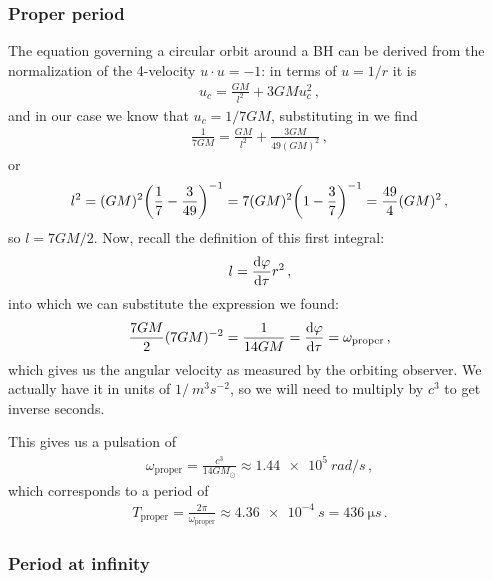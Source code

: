\documentclass[main.tex]{subfiles}
\begin{document}
\subsubsection{Proper period}

The equation governing a circular orbit around a BH can be derived from the normalization of the 4-velocity \(u \cdot u = -1\): in terms of \(u = 1/r\) it is 
%
\begin{align}
  u_c = \frac{GM}{l^2} + 3 GM u_c^2
\,,
\end{align}
%
and in our case we know that \(u_c = 1/7GM\), substituting in we find 
%
\begin{align}
  \frac{1}{7GM} = \frac{GM}{l^2} + \frac{3GM}{49 (GM)^2}
\,,
\end{align}
%
or 
%
\begin{align}
  l^2 = (GM)^2 \qty(\frac{1}{7} - \frac{3}{49})^{-1}
  = 7 (GM)^2 \qty(1 - \frac{3}{7})^{-1} = \frac{49}{4} (GM)^2
\,, 
\end{align}
%
so \(l = 7GM/2\). Now, recall the definition of this first integral: 
%
\begin{align}
  l = \dv{\varphi }{\tau } r^2
\,,
\end{align}
%
into which we can substitute the expression we found: 
%
\begin{align}
  \frac{7GM}{2} (7GM)^{-2} = \frac{1}{14GM} =  \dv{\varphi }{\tau } = \omega_{\text{proper}}
\,,
\end{align}
%
which gives us the angular velocity as measured by the orbiting observer. We actually have it in units of $1/\SI{}{m^3 s^{-2}}$, so we will need to multiply by \(c^3\) to get inverse seconds.

This gives us a pulsation of 
%
\begin{align}
  \omega _{\text{proper}} = \frac{c^3}{14GM_{\odot}} \approx 
  \SI{1.44e5}{rad/s}
\,,
\end{align}
%
which corresponds to a period of 
%
\begin{align}
  T _{\text{proper}} = \frac{2\pi}{\omega _{\text{proper}}} \approx \SI{4.36e-4}{s} = \SI{436}{\micro s}
\,.
\end{align}

\subsubsection{Period at infinity}
\end{document}
